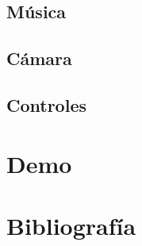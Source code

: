 \documentclass[11pt,a4paper]{article}
\begin{document}
\subsection{Música}
\subsection{Cámara}
\subsection{Controles}

\section{Demo}

\section{Bibliografía}
\end{document}
